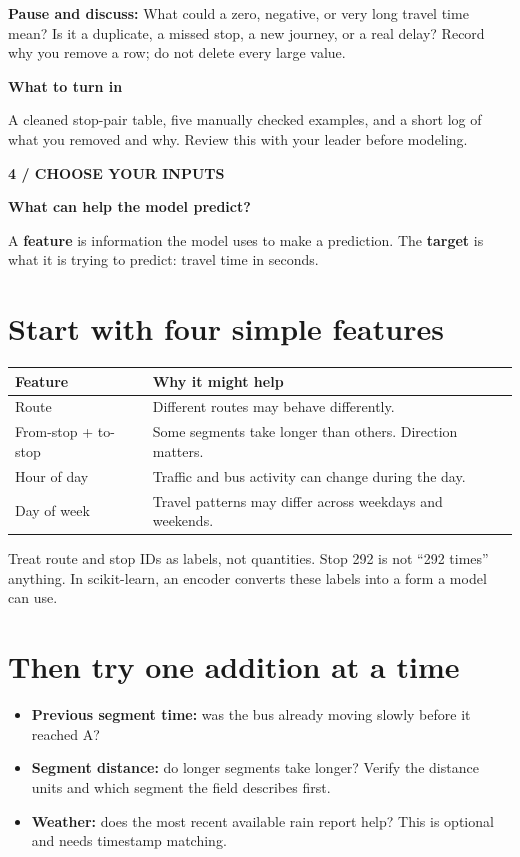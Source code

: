 \documentclass[11pt,letterpaper]{article}
\newcommand{\heading}[2]{{\small\color{accent}\textbf{#1}}\par{\LARGE\bfseries #2}\par\vspace{4pt}}
\newcommand{\turnin}[1]{\vspace{6pt}\colorbox{light}{\parbox{0.96\linewidth}{\textbf{What to turn in}\par #1}}}
\begin{document}
\textbf{Pause and discuss:} What could a zero, negative, or very long travel
time mean? Is it a duplicate, a missed stop, a new journey, or a real delay?
Record why you remove a row; do not delete every large value.

\turnin{A cleaned stop-pair table, five manually checked examples, and a
short log of what you removed and why. Review this with your leader before modeling.}

\newpage
\heading{4 / CHOOSE YOUR INPUTS}{What can help the model predict?}
A \textbf{feature} is information the model uses to make a prediction.
The \textbf{target} is what it is trying to predict: travel time in seconds.

\section*{Start with four simple features}
\renewcommand{\arraystretch}{1.25}
\begin{tabularx}{\linewidth}{@{}p{1.4in}X@{}}
\toprule
\textbf{Feature} & \textbf{Why it might help}\\
\midrule
Route & Different routes may behave differently.\\
From-stop + to-stop & Some segments take longer than others. Direction matters.\\
Hour of day & Traffic and bus activity can change during the day.\\
Day of week & Travel patterns may differ across weekdays and weekends.\\
\bottomrule
\end{tabularx}
Treat route and stop IDs as labels, not quantities. Stop 292 is not
``292 times'' anything. In scikit-learn, an encoder converts these labels
into a form a model can use.

\section*{Then try one addition at a time}
\begin{itemize}
\item \textbf{Previous segment time:} was the bus already moving slowly
before it reached A?
\item \textbf{Segment distance:} do longer segments take longer? Verify
the distance units and which segment the field describes first.
\item \textbf{Weather:} does the most recent available rain report help?
This is optional and needs timestamp matching.
\end{itemize}
\end{document}
